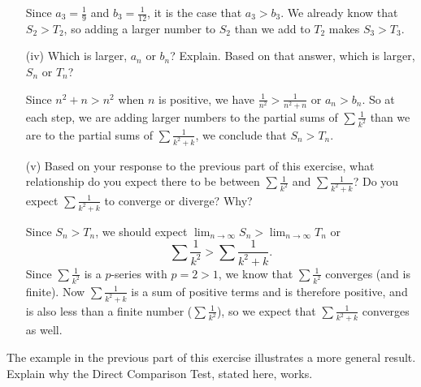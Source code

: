 \begin{exercises}
\begin{itemize}
\begin{exerciseSolution}
Since $a_3 = \frac{1}{9}$ and $b_3 = \frac{1}{12}$, it is the case that $a_3 > b_3$. We already know that $S_2 > T_2$, so adding a larger number to $S_2$ than we add to $T_2$ makes $S_3 > T_3$.
\end{exerciseSolution}

        \item[(iv)] Which is larger, $a_n$ or $b_n$? Explain. Based on that answer, which is larger, $S_n$ or $T_n$?

\begin{exerciseSolution}
Since $n^2+n > n^2$ when $n$ is positive, we have $\frac{1}{n^2} > \frac{1}{n^2+n}$ or $a_n > b_n$. So at each step, we are adding larger numbers to the partial sums of $ \sum \frac{1}{k^2}$ than we are to the partial sums of $ \sum \frac{1}{k^2+k}$, we conclude that $S_n > T_n$.
\end{exerciseSolution}

        \item[(v)] Based on your response to the previous part of this exercise, what relationship do you expect there to be between $ \sum \frac{1}{k^2}$ and  $ \sum \frac{1}{k^2+k}$? Do you expect $ \sum \frac{1}{k^2+k}$ to converge or diverge? Why?

\begin{exerciseSolution}
Since $S_n > T_n$, we should expect $ \lim_{n \to \infty} S_n > \lim_{n \to \infty} T_n$ or
\[ \sum \frac{1}{k^2} >  \sum \frac{1}{k^2+k}.\]
Since $ \sum \frac{1}{k^2}$ is a $p$-series with $p=2 > 1$, we know that $ \sum \frac{1}{k^2}$ converges (and is finite). Now $ \sum \frac{1}{k^2+k}$ is a sum of positive terms and is therefore positive, and is also less than a finite number ($ \sum \frac{1}{k^2}$), so we expect that $ \sum \frac{1}{k^2+k}$ converges as well.
\end{exerciseSolution}

        \end{itemize}

    \item The example in the previous part of this exercise illustrates a more general result. Explain why the Direct Comparison Test, stated here, works.
    
\vspace*{5pt}
\nin {}
\vspace*{1pt}


\end{exercises}
